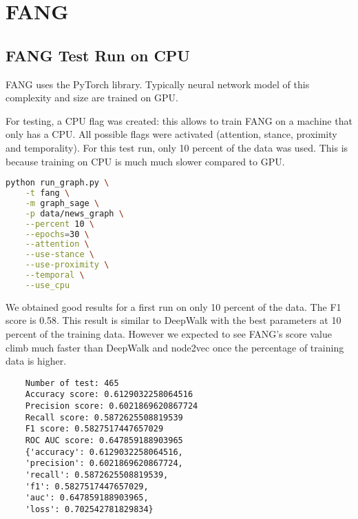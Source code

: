 
\chapter{FANG} %
\label{cha:fang}

\section{FANG Test Run on CPU}

FANG uses the PyTorch library. 
Typically neural network model of this complexity and size are trained on GPU.

For testing, a CPU flag was created: this allows to train FANG on a machine that only has a CPU.
All possible flags were activated (attention, stance, proximity and temporality).
For this test run, only 10 percent of the data was used.
This is because training on CPU is much much slower compared to GPU.

\begin{lstlisting}[language=bash]
python run_graph.py \
    -t fang \
    -m graph_sage \
    -p data/news_graph \
    --percent 10 \
    --epochs=30 \
    --attention \
    --use-stance \
    --use-proximity \
    --temporal \
    --use_cpu
\end{lstlisting}

We obtained good results for a first run on only 10 percent of the data.
The F1 score is 0.58.
This result is similar to DeepWalk with the best parameters at 10 percent of the training data. 
However we expected to see FANG's score value climb much faster than DeepWalk and node2vec once the percentage of training data is higher.

\begin{lstlisting}
    Number of test: 465
    Accuracy score: 0.6129032258064516
    Precision score: 0.6021869620867724
    Recall score: 0.5872625508819539
    F1 score: 0.5827517447657029
    ROC AUC score: 0.647859188903965
    {'accuracy': 0.6129032258064516, 
    'precision': 0.6021869620867724, 
    'recall': 0.5872625508819539, 
    'f1': 0.5827517447657029, 
    'auc': 0.647859188903965, 
    'loss': 0.702542781829834}
\end{lstlisting}
